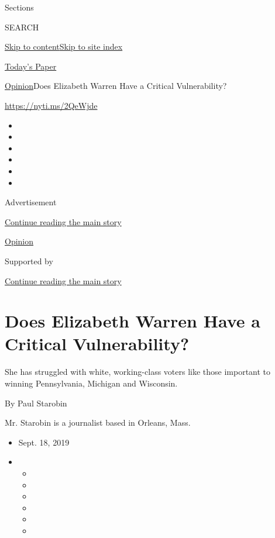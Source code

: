 Sections

SEARCH

\protect\hyperlink{site-content}{Skip to
content}\protect\hyperlink{site-index}{Skip to site index}

\href{https://myaccount.nytimes3xbfgragh.onion/auth/login?response_type=cookie\&client_id=vi}{}

\href{https://www.nytimes3xbfgragh.onion/section/todayspaper}{Today's
Paper}

\href{/section/opinion}{Opinion}\textbar{}Does Elizabeth Warren Have a
Critical Vulnerability?

\url{https://nyti.ms/2QeWjde}

\begin{itemize}
\item
\item
\item
\item
\item
\item
\end{itemize}

Advertisement

\protect\hyperlink{after-top}{Continue reading the main story}

\href{/section/opinion}{Opinion}

Supported by

\protect\hyperlink{after-sponsor}{Continue reading the main story}

\hypertarget{does-elizabeth-warren-have-a-critical-vulnerability}{%
\section{Does Elizabeth Warren Have a Critical
Vulnerability?}\label{does-elizabeth-warren-have-a-critical-vulnerability}}

She has struggled with white, working-class voters like those important
to winning Pennsylvania, Michigan and Wisconsin.

By Paul Starobin

Mr. Starobin is a journalist based in Orleans, Mass.

\begin{itemize}
\item
  Sept. 18, 2019
\item
  \begin{itemize}
  \item
  \item
  \item
  \item
  \item
  \item
  \end{itemize}
\end{itemize}

